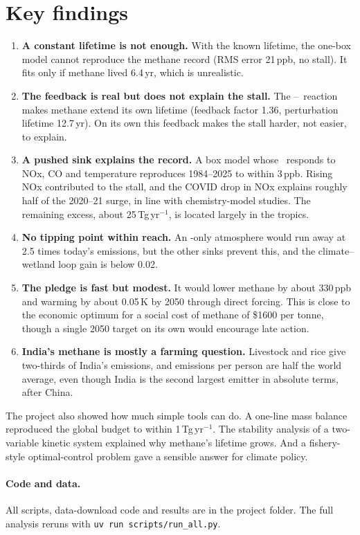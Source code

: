 \documentclass[11pt,a4paper]{article}
\newcommand{\CH}{\ce{CH4}}
\newcommand{\OH}{\ce{OH}}
\begin{document}
\section{Key findings}
\begin{enumerate}\itemsep2pt
\item \textbf{A constant lifetime is not enough.} With the known lifetime, the one-box model cannot reproduce the methane record (RMS error 21\,ppb, no stall). It fits only if methane lived 6.4\,yr, which is unrealistic.
\item \textbf{The feedback is real but does not explain the stall.} The \CH--\OH\ reaction makes methane extend its own lifetime (feedback factor 1.36, perturbation lifetime 12.7\,yr). On its own this feedback makes the stall harder, not easier, to explain.
\item \textbf{A pushed sink explains the record.} A box model whose \OH\ responds to NOx, CO and temperature reproduces 1984--2025 to within 3\,ppb. Rising NOx contributed to the stall, and the COVID drop in NOx explains roughly half of the 2020--21 surge, in line with chemistry-model studies. The remaining excess, about 25\,Tg\,yr$^{-1}$, is located largely in the tropics.
\item \textbf{No tipping point within reach.} An \OH-only atmosphere would run away at 2.5 times today's emissions, but the other sinks prevent this, and the climate--wetland loop gain is below 0.02.
\item \textbf{The pledge is fast but modest.} It would lower methane by about 330\,ppb and warming by about 0.05\,K by 2050 through direct forcing. This is close to the economic optimum for a social cost of methane of \$1600 per tonne, though a single 2050 target on its own would encourage late action.
\item \textbf{India's methane is mostly a farming question.} Livestock and rice give two-thirds of India's emissions, and emissions per person are half the world average, even though India is the second largest emitter in absolute terms, after China.
\end{enumerate}

The project also showed how much simple tools can do. A one-line mass balance reproduced the global budget to within 1\,Tg\,yr$^{-1}$. The stability analysis of a two-variable kinetic system explained why methane's lifetime grows. And a fishery-style optimal-control problem gave a sensible answer for climate policy.

\paragraph{Code and data.} All scripts, data-download code and results are in the project folder. The full analysis reruns with \texttt{uv run scripts/run\_all.py}.
\end{document}
